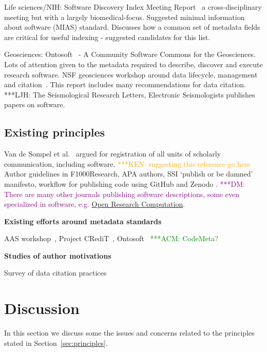 \documentclass[11pt, oneside]{amsart}
\newcommand{\niemnote}[1]{ {\textcolor{orange} { ***KEN: #1 }}} %
\newcommand{\dmnote}[1]{ {\textcolor{purple} { ***DM: #1 }}} %
\newcommand{\acmnote}[1]{ {\textcolor{green} { ***ACM: #1 }}} %
\newcommand{\LJHnote}[1]{ {\textcolor{fuschsia} { ***LJH: #1 }}} %
\begin{document}
Life sciences/NIH: Software Discovery Index Meeting Report~\cite{software-discovery-index} a cross-disciplinary meeting
but with a largely biomedical-focus. Suggested minimal information about software (MIAS) standard. Discusses how a common set of metadata
fields are critical for useful indexing - suggested candidates for this list.

Geosciences: Ontosoft~\cite{ontosoft} - A Community Software Commons for the Geosciences. Lots of attention given to the metadata
required to describe, discover and execute research software. NSF geosciences workshop around data lifecycle, management and citation~\cite{nsf-geo-data}. This report includes many recommendations for data citation.
\LJHnote{ The Seismological Research Letters, Electronic Seismologists publishes papers on software.} %

\subsection{Existing principles}

Van de Sompel et al.~\cite{VandeSompel2004} argued for registration of all units of scholarly communication, including software.\niemnote{suggesting this reference go here}
Author guidelines in F1000Research, APA authors, SSI `publish or be damned'
\cite{ssi-publish-or-be-damned} manifesto, workflow for publishing code using
GitHub and Zenodo \cite{github-citable-code-guide}.
\dmnote{There are many other journals publishing software descriptions, some even specialized in software, e.g. \href{http://www.openresearchcomputation.com}{Open Research Computation}.}

\textbf{Existing efforts around metadata standards}

AAS workshop~\cite{aas-software-index}, Project CRediT~\cite{casrai-credit}, Ontosoft~\cite{ontosoft}
\acmnote{ CodeMeta? }

\textbf{Studies of author motivations}

Survey of data citation practices \cite{Kratz_2015}


\section{Discussion}
\label{sec:discussion}

In this section we discuss some the issues and concerns related to the principles stated in Section~\ref{sec:principles}.
\end{document}
